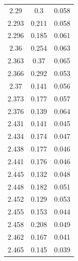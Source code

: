 \documentclass[preprint2,times,tighten]{aastex6}
\begin{document}
\begin{table}
{\begin{tabular}{ccc}
2.29 & 0.3 & 0.058 \\
2.293 & 0.211 & 0.058 \\
2.296 & 0.185 & 0.061 \\
2.36 & 0.254 & 0.063 \\
2.363 & 0.37 & 0.065 \\
2.366 & 0.292 & 0.053 \\
2.37 & 0.141 & 0.056 \\
2.373 & 0.177 & 0.057 \\
2.376 & 0.139 & 0.064 \\
2.431 & 0.141 & 0.045 \\
2.434 & 0.174 & 0.047 \\
2.438 & 0.177 & 0.046 \\
2.441 & 0.176 & 0.046 \\
2.445 & 0.132 & 0.048 \\
2.448 & 0.182 & 0.051 \\
2.452 & 0.129 & 0.053 \\
2.455 & 0.153 & 0.044 \\
2.458 & 0.208 & 0.049 \\
2.462 & 0.167 & 0.041 \\
2.465 & 0.145 & 0.039 \\
\hline
\end{tabular}
}
\end{table}


\end{document}
